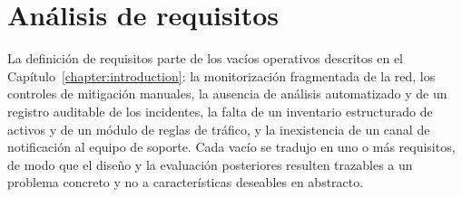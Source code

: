 \section{Análisis de requisitos}
\label{sec:requisitos}

La definición de requisitos parte de los vacíos operativos descritos en el Capítulo~\ref{chapter:introduction}: la monitorización fragmentada de la red, los controles de mitigación manuales, la ausencia de análisis automatizado y de un registro auditable de los incidentes, la falta de un inventario estructurado de activos y de un módulo de reglas de tráfico, y la inexistencia de un canal de notificación al equipo de soporte. Cada vacío se tradujo en uno o más requisitos, de modo que el diseño y la evaluación posteriores resulten trazables a un problema concreto y no a características deseables en abstracto.


